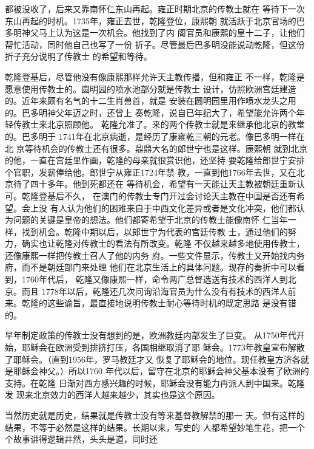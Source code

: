 都被没收了，后来又靠南怀仁东山再起。雍正时期北京的传教士就在%
等待下一次东山再起的时机。1735年，雍正去世，乾隆登位，康熙朝%
就活跃于北京官场的巴多明神父马上认为这是一次机会。他找到了内%
阁官员和康熙的皇十二子，让他们帮忙活动，同时他自己也写了一份%
折子。尽管最后巴多明没能说动乾隆，但这份折子充分说明了传教士%
的希望和等待。%
\par
乾隆登基后，尽管他没有像康熙那样允许天主教传播，但和雍正%
不一样，乾隆是愿意使用传教士的。圆明园的喷水池部分就是传教士%
设计，仿照欧洲宫廷建造的。近年来颇有名气的十二生肖兽首，就是%
安装在圆明园里用作喷水龙头之用的。巴多明神父年迈之时，还曾上%
奏乾隆，说自已年纪大了，希望能允许两个年轻传教士来北京照顾他。%
乾隆允准了。来的两个传教士就是来继承他北京的教堂的。巴多明于%
1741年在北京病逝，是经历了康雍乾三朝的元老。像巴多明一样在北%
京等待机会的传教士还有很多。鼎鼎大名的郎世宁也是这样。康熙朝%
就到北京的他，一直在宫廷里作画，乾隆的母亲就很赏识他，还坚持%
要乾隆给郎世宁安排个官职，发薪俸给他。郎世宁从雍正1724年禁%
教，一直到他1766年去世，又在北京待了四十多年。他到死都还在%
等待机会，希望有一天能让天主教被朝廷重新认可。乾隆登基后不久，%
在澳门的传教士专门开过会讨论天主教在中国是否还有希望。会上没%
有人认为他们的困难来自于中西文化差异或者是文化冲突，他们都认%
为问题的关键是皇帝的想法。他们都寄希望于北京的传教士能像南怀%
仁当年一样，找到机会。乾隆中期以后，以郎世宁为代表的宫廷传教%
士，通过他们的努力，确实也让乾隆对传教士的看法有所改变。乾隆%
不仅越来越多地使用传教士，还像康熙一样把传教士召人了他的内务%
府。一些文件显示，传教士又开始找内务府，而不是朝廷部门来处理%
他们在北京生活上的具体问题。现存的奏折中可以看到，1760年代后，%
乾隆又像康熙一样，命令两广总督选送有技术的西洋人到北京。而且%
1778年以后，乾隆还几次问询沿海官员为什么没有有技术的西洋人前%
来。乾隆的这些谕旨，最直接地说明传教士耐心等待时机的既定思路%
是没有错的。%
\par
早年制定政策的传教士没有想到的是，欧洲教廷内部发生了巨变。%
从1750年代开始，耶稣会在欧洲受到排挤打压，各国相继取消了耶%
稣会。1773年教皇宣布解散了耶稣会。（直到1956年，罗马教廷才又%
恢复了耶稣会的地位。现任教皇方济各就是耶稣会神父。）所以1760%
年代以后，留守在北京的耶稣会神父基本没有了欧洲的支持。在乾隆%
日渐对西方感兴趣的时候，耶稣会没有能力再派人到中国来。乾隆发%
现来北京效力的西洋人越来越少，其实也是这个原因。%
\par
当然历史就是历史，结果就是传教士没有等来基督教解禁的那一%
天。但有这样的结果，不等于必然是这样的结果。长期以来，写史的%
人都希望妙笔生花，把一个个故事讲得逻辑井然，头头是道，同时还%
